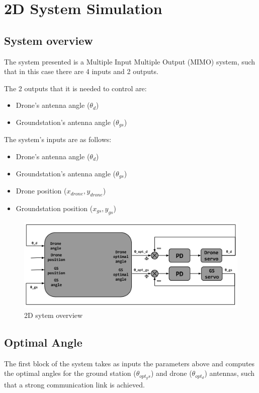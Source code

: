\section{2D System Simulation}

\subsection{System overview}
The system presented is a Multiple Input Multiple Output (MIMO) system, such that in this case there are 4 inputs and 2 outputs. 

The 2 outputs that it is needed to control are:
\begin{itemize}
	\item Drone's antenna angle ($\theta_{d}$)
	\item Groundstation's antenna angle ($\theta_{gs}$)
\end{itemize}

The system's inputs are as follows:
\begin{itemize}
	\item Drone's antenna angle ($\theta_{d}$)
	\item Groundstation's antenna angle ($\theta_{gs}$)
	\item Drone position ($x_{drone},y_{drone}$)
	\item Groundstation position ($x_{gs},y_{gs}$)
\end{itemize}

\begin{figure}
	\centering
	\includegraphics[scale=0.42]{figures/2d_system.png}
	\caption{2D sytem overview}
	\label{fig:2d_system}
\end{figure}

\subsection{Optimal Angle}
The first block of the system takes as inputs the parameters above and computes the optimal angles for the ground station ($\theta_{opt_gs}$) and drone ($\theta_{opt_d}$) antennas, such that a strong communication link is achieved.  


